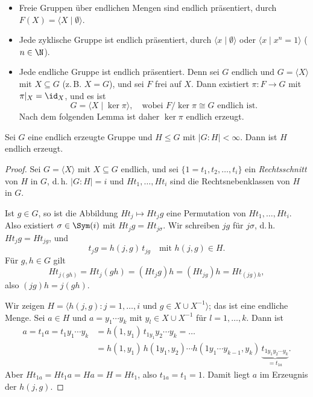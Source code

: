 \documentclass[11pt]{article}
\begin{document}
\begin{example}
  \begin{itemize}
    \item Freie Gruppen über endlichen Mengen sind endlich präsentiert, durch $F(X) = \langle X \mid \emptyset \rangle$.
    \item Jede zyklische Gruppe ist endlich präsentiert, durch $\langle x \mid \emptyset \rangle$ oder $\langle x \mid x^n = 1 \rangle$ ($n \in \N$).
    \item Jede endliche Gruppe ist endlich präsentiert. Denn sei $G$ endlich und $G = \langle X \rangle$ mit $X \subseteq G$ (z.\,B. $X = G$), und sei $F$ frei auf $X$. Dann existiert $\pi\colon F \to G$ mit $\pi|_X = \id_X$, und es ist
      \[ G = \langle X \mid \ker\pi \rangle, \quad \text{wobei } F/\ker\pi \cong G \text{ endlich ist}. \]
      Nach dem folgenden Lemma ist daher $\ker\pi$ endlich erzeugt.
  \end{itemize}
\end{example}


\begin{lemma}\Theorem
  Sei $G$ eine endlich erzeugte Gruppe und $H \le G$ mit $\lvert G : H \rvert < \infty$. Dann ist $H$ endlich erzeugt.
\end{lemma}

\begin{proof}
  Sei $G = \langle X \rangle$ mit $X \subseteq G$ endlich, und sei $\{1 = t_1, t_2, \dots, t_i\}$ ein \emph{Rechtsschnitt} von $H$ in $G$, d.\,h. $\lvert G : H \rvert = i$ und $Ht_1, \dots, Ht_i$ sind die Rechtsnebenklassen von $H$ in $G$.

  Ist $g \in G$, so ist die Abbildung $Ht_j \mapsto Ht_j g$ eine Permutation von $Ht_1, \dots, Ht_i$. Also existiert $\sigma \in \Sym(i)$ mit $Ht_j g = Ht_{j\sigma}$. Wir schreiben $jg$ für $j\sigma$, d.\,h. $Ht_j g = Ht_{jg}$, und
  \[ t_j g = h(j, g)\, t_{jg} \quad \text{mit } h(j, g) \in H. \]
  Für $g, h \in G$ gilt
  \[ Ht_{j(gh)} = Ht_j(gh) = (Ht_j g)h = (Ht_{jg})h = Ht_{(jg)h}, \]
  also $(jg)h = j(gh)$.


  Wir zeigen $H = \langle h(j, g) : j = 1, \dots, i \text{ und } g \in X \cup X^{-1} \rangle$; das ist eine endliche Menge. Sei $a \in H$ und $a = y_1 \dotsm y_k$ mit $y_l \in X \cup X^{-1}$ für $l = 1, \dots, k$. Dann ist
  \begin{align*}
    a = t_1 a = t_1 y_1 \dotsm y_k &= h(1, y_1)\, t_{1y_1} y_2 \dotsm y_k = \dots \\
    &= h(1, y_1)\, h(1y_1, y_2) \dotsm h(1y_1 \dotsm y_{k-1}, y_k)\, \underbrace{t_{1y_1 y_2 \dotsm y_k}}_{= t_{1a}}.
  \end{align*}
  Aber $Ht_{1a} = Ht_1 a = Ha = H = Ht_1$, also $t_{1a} = t_1 = 1$. Damit liegt $a$ im Erzeugnis der $h(j, g)$.
\end{proof}
\end{document}
